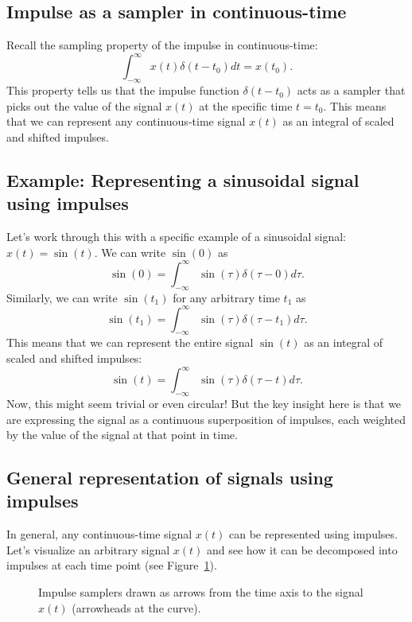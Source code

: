 \subsection{Impulse as a sampler in continuous-time}
Recall the sampling property of the impulse in continuous-time:
\[
\int_{-\infty}^{\infty} x(t) \delta(t - t_0) dt = x(t_0).
\]
This property tells us that the impulse function $\delta(t - t_0)$ acts as a sampler that picks out the value of the signal $x(t)$ at the specific time $t = t_0$. This means that we can represent any continuous-time signal $x(t)$ as an integral of scaled and shifted impulses. 
\subsection{Example: Representing a sinusoidal signal using impulses}
Let's work through this with a specific example of a sinusoidal signal: $x(t) = \sin(t)$. We can write $\sin(0)$ as
\[
\sin(0) = \int_{-\infty}^{\infty} \sin(\tau) \delta(\tau - 0) d\tau.
\]
Similarly, we can write $\sin(t_1)$ for any arbitrary time $t_1$ as
\[
\sin(t_1) = \int_{-\infty}^{\infty} \sin(\tau) \delta(\tau - t_1) d\tau.
\]
This means that we can represent the entire signal $\sin(t)$ as an integral of scaled and shifted impulses:
\[
\sin(t) = \int_{-\infty}^{\infty} \sin(\tau) \delta(\tau - t) d\tau.
\]
Now, this might seem trivial or even circular! But the key insight here is that we are expressing the signal as a continuous superposition of impulses, each weighted by the value of the signal at that point in time. 

\subsection{General representation of signals using impulses}
In general, any continuous-time signal $x(t)$ can be represented using impulses. Let's visualize an arbitrary signal $x(t)$ and see how it can be decomposed into impulses at each time point (see Figure~\ref{fig:ct-impulse-samplers}).
\begin{figure}[h]
\centering
{}
\caption{Impulse samplers drawn as arrows from the time axis to the signal $x(t)$ (arrowheads at the curve).}
\label{fig:ct-impulse-samplers}
\end{figure}


